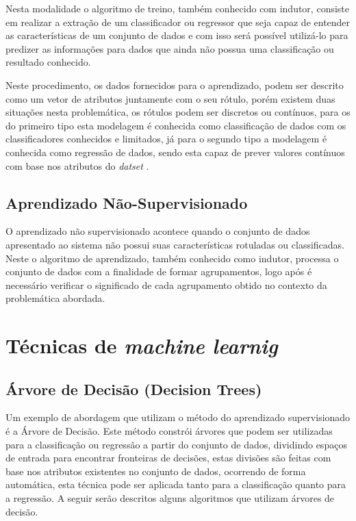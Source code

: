 \documentclass[
12pt,				%
oneside,			%
a4paper,			%
english,			%
french,				%
spanish,			%
brazil				%
]{abntex2}
\begin{document}
Nesta modalidade o algoritmo de treino, também conhecido com indutor, consiste em realizar a extração de um classificador ou regressor que seja capaz de entender as características de um conjunto de dados e com isso será possível utilizá-lo para predizer as informações para dados que ainda não possua uma classificação ou resultado conhecido. 

Neste procedimento, os dados fornecidos para o aprendizado, podem ser descrito como um vetor de atributos juntamente com o seu rótulo, porém existem duas situações nesta problemática, os rótulos podem ser discretos ou contínuos, para os do primeiro tipo esta modelagem é conhecida como classificação de dados com os classificadores conhecidos e limitados, já para o segundo tipo a modelagem é conhecida como regressão de dados, sendo esta capaz de prever valores contínuos com base nos atributos do \textit{datset} \cite{monard2003conceitos}.


\subsection{Aprendizado Não-Supervisionado}

O aprendizado não supervisionado acontece quando o conjunto de dados apresentado ao sistema não possui suas  características rotuladas ou classificadas. Neste o algoritmo de aprendizado, também conhecido como indutor, processa o conjunto de dados com a finalidade de formar agrupamentos, logo após é necessário verificar o significado de cada agrupamento obtido no contexto da problemática abordada.

\section{Técnicas de \textit{machine learnig}}

\subsection{Árvore de Decisão (Decision Trees)}


Um exemplo de abordagem que utilizam o método do aprendizado supervisionado é a Árvore de Decisão. Este método constrói árvores que podem ser utilizadas para  a classificação ou regressão a partir do conjunto de dados, dividindo espaços de entrada para encontrar fronteiras de decisões, estas divisões são feitas com base nos atributos existentes no conjunto de dados, ocorrendo de forma automática, esta técnica pode ser aplicada tanto para a classificação quanto para a regressão\cite{quinlan1986induction}. A seguir serão descritos alguns algoritmos que utilizam árvores de decisão.   
\end{document}
